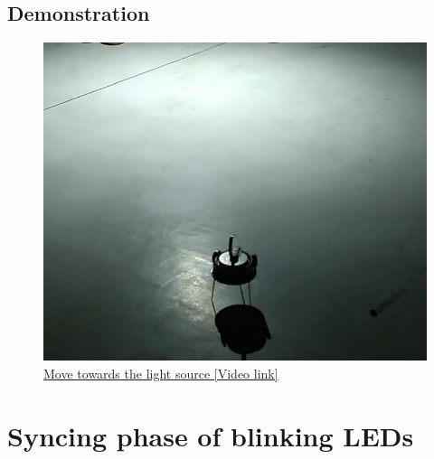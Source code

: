 \documentclass{article}
\begin{document}
\subsection{Demonstration}
\begin{figure}
    \centering
    \includegraphics[scale=0.4]{images/move_towards_light}
    \caption{\href{https://www.google.com/url?sa=j&url=https\%3A\%2F\%2Fphotos.app.goo.gl\%2FnUNghDg4nJygpzUu5&uct=1551610784&usg=G0tZGJ7iMN79F5qGk1QMw5rfodM.}{Move towards the light source [Video link]}}
\end{figure}
\section{Syncing phase of blinking LEDs}
\end{document}
